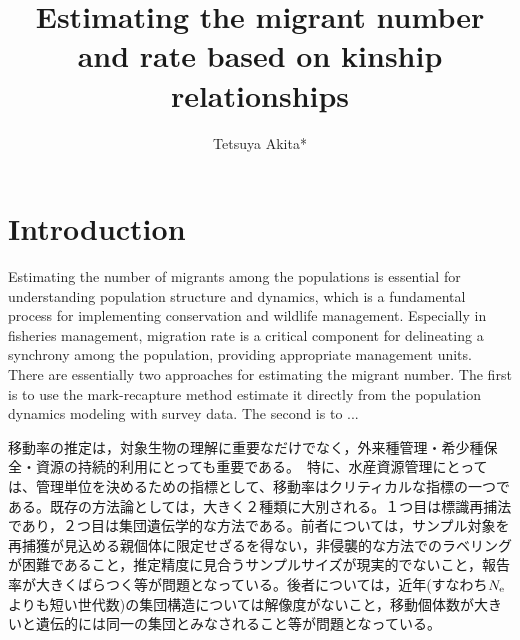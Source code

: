 \documentclass[AMA,STIX1COL]{WileyNJD-v2}
\begin{document}
\title{Estimating the migrant number and rate based on kinship relationships}%

\author[1]{Tetsuya Akita*}



\address[1]{, , }





\maketitle



\section{Introduction}\label{sec1}

Estimating the number of migrants among the populations is essential for understanding population structure and dynamics, which is a fundamental process for implementing conservation and wildlife management. Especially in fisheries management, migration rate is a critical component for delineating a synchrony among the population, providing appropriate management units. There are essentially two approaches for estimating the migrant number. The first is to use the mark-recapture method estimate it directly from the population dynamics modeling with survey data. The second is to ...

移動率の推定は，対象生物の理解に重要なだけでなく，外来種管理・希少種保全・資源の持続的利用にとっても重要である。　特に、水産資源管理にとっては、管理単位を決めるための指標として、移動率はクリティカルな指標の一つである。既存の方法論としては，大きく２種類に大別される。１つ目は標識再捕法であり，２つ目は集団遺伝学的な方法である。前者については，サンプル対象を再捕獲が見込める親個体に限定せざるを得ない，非侵襲的な方法でのラベリングが困難であること，推定精度に見合うサンプルサイズが現実的でないこと，報告率が大きくばらつく等が問題となっている。後者については，近年(すなわち$N_{\rm e}$よりも短い世代数)の集団構造については解像度がないこと，移動個体数が大きいと遺伝的には同一の集団とみなされること等が問題となっている。
\end{document}
